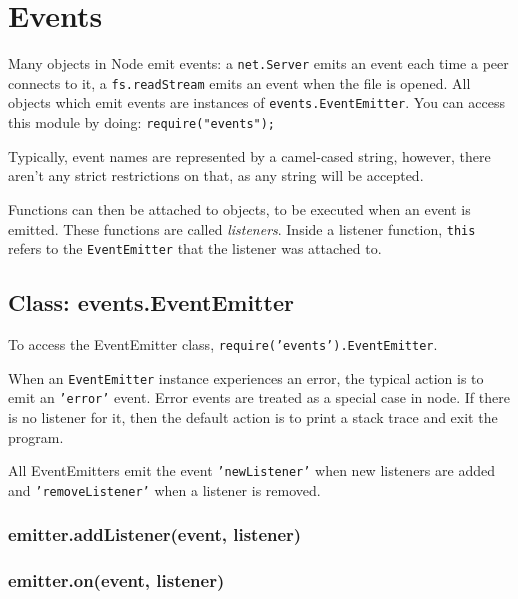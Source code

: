 \section{Events}

\begin{Shaded}
\begin{Highlighting}[]
\NormalTok{: } 
\end{Highlighting}
\end{Shaded}

Many objects in Node emit events: a \texttt{net.Server} emits an event
each time a peer connects to it, a \texttt{fs.readStream} emits an event
when the file is opened. All objects which emit events are instances of
\texttt{events.EventEmitter}. You can access this module by doing:
\texttt{require("events");}

Typically, event names are represented by a camel-cased string, however,
there aren't any strict restrictions on that, as any string will be
accepted.

Functions can then be attached to objects, to be executed when an event
is emitted. These functions are called \emph{listeners}. Inside a
listener function, \texttt{this} refers to the \texttt{EventEmitter}
that the listener was attached to.

\subsection{Class: events.EventEmitter}

To access the EventEmitter class,
\texttt{require('events').EventEmitter}.

When an \texttt{EventEmitter} instance experiences an error, the typical
action is to emit an \texttt{'error'} event. Error events are treated as
a special case in node. If there is no listener for it, then the default
action is to print a stack trace and exit the program.

All EventEmitters emit the event \texttt{'newListener'} when new
listeners are added and \texttt{'removeListener'} when a listener is
removed.

\subsubsection{emitter.addListener(event, listener)}

\subsubsection{emitter.on(event, listener)}

